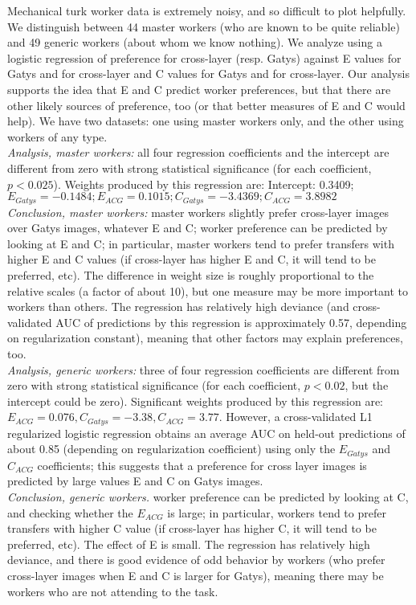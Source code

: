 \documentclass[runningheads]{llncs}
\begin{document}
Mechanical turk worker data is extremely noisy, and so difficult to plot helpfully.  We distinguish between 44 master workers (who are known to be quite reliable) and 49 generic workers (about whom we know nothing).  We analyze using a logistic regression of preference for cross-layer (resp. Gatys) against
E values for Gatys and for cross-layer and C values for Gatys and for cross-layer.  Our analysis supports the idea that E and C predict worker preferences, but that
there are other likely sources of preference, too (or that better measures of E and C would help).  We have two datasets: one using master workers only, and the other using
workers of any type. \\
 {\em Analysis, master workers:}  all four regression coefficients and the intercept are different from zero with strong statistical significance  (for each coefficient, $p<0.025$).  Weights produced by this regression are:   Intercept: 0.3409;    $E_{Gatys}= -0.1484;    E_{ACG}=  0.1015;C_{Gatys}=-3.4369;C_{ACG}=3.8982$ \\
{\em Conclusion, master workers:} master workers slightly prefer cross-layer images over Gatys images, whatever E and C;
worker preference can be predicted by looking at E and C; in particular, master workers tend to prefer transfers with higher E and C values (if cross-layer has higher E and C, it will tend to be preferred, etc).  The difference in weight size is roughly proportional to the relative scales (a factor of about 10), but one measure may be more important to workers than others.  The regression has relatively high deviance (and
cross-validated AUC of predictions by this regression is approximately 0.57, depending on regularization constant), meaning that other factors may explain preferences, too.  \\
{\em Analysis, generic workers:}  three of four regression coefficients are different from zero with strong statistical significance (for each coefficient, $p<0.02$, but the intercept could be zero).  Significant weights produced by this regression
are:$E_{ACG}=0.076, C_{Gatys}=-3.38, C_{ACG}=3.77$.  However, a cross-validated L1 regularized logistic regression obtains an average AUC on held-out predictions of about 0.85 (depending on regularization coefficient) using only the $E_{Gatys}$ and $C_{ACG}$ coefficients; this suggests that a preference for cross layer images is predicted by large values E and C on Gatys images. \\
{\em Conclusion, generic workers.} worker preference can be predicted by looking at C, and checking whether the $E_{ACG}$ is large; in particular, workers tend to prefer transfers with higher  C value (if cross-layer has higher  C, it will tend to be preferred, etc).  The effect of E is small.  The regression has relatively high deviance, and there is good evidence of odd behavior by workers (who prefer cross-layer images when E and C is larger for Gatys), meaning there may be workers who are not attending to the task.
\end{document}
